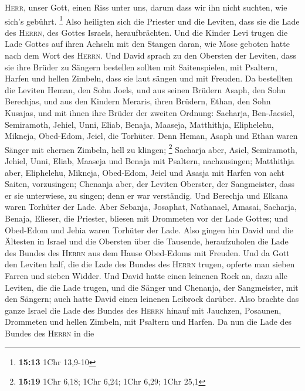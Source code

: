 \textsc{Herr}, unser Gott, einen Riss unter uns, darum dass wir ihn
nicht suchten, wie sich's gebührt. \footnote{\textbf{15:13} 1Chr 13,9-10}
 Also heiligten sich die Priester und die Leviten, dass
sie die Lade des \textsc{Herrn}, des Gottes Israels, heraufbrächten.
 Und die Kinder Levi trugen die Lade Gottes auf ihren
Achseln mit den Stangen daran, wie Mose geboten hatte nach dem Wort des
\textsc{Herrn}.  Und David sprach zu den Obersten der
Leviten, dass sie ihre Brüder zu Sängern bestellen sollten mit
Saitenspielen, mit Psaltern, Harfen und hellen Zimbeln, dass sie laut
sängen und mit Freuden.  Da bestellten die Leviten Heman,
den Sohn Joels, und aus seinen Brüdern Asaph, den Sohn Berechjas, und
aus den Kindern Meraris, ihren Brüdern, Ethan, den Sohn Kusajas,
 und mit ihnen ihre Brüder der zweiten Ordnung: Sacharja,
Ben-Jaesiel, Semiramoth, Jehiel, Unni, Eliab, Benaja, Maaseja,
Matthithja, Eliphelehu, Mikneja, Obed-Edom, Jeiel, die Torhüter.
 Denn Heman, Asaph und Ethan waren Sänger mit ehernen
Zimbeln, hell zu klingen; \footnote{\textbf{15:19} 1Chr 6,18; 1Chr 6,24;
  1Chr 6,29; 1Chr 25,1}  Sacharja aber, Asiel,
Semiramoth, Jehiel, Unni, Eliab, Maaseja und Benaja mit Psaltern,
nachzusingen;  Matthithja aber, Eliphelehu, Mikneja,
Obed-Edom, Jeiel und Asasja mit Harfen von acht Saiten, vorzusingen;
 Chenanja aber, der Leviten Oberster, der Sangmeister,
dass er sie unterwiese, zu singen; denn er war verständig.
 Und Berechja und Elkana waren Torhüter der Lade.
 Aber Sebanja, Josaphat, Nathanael, Amasai, Sacharja,
Benaja, Elieser, die Priester, bliesen mit Drommeten vor der Lade
Gottes; und Obed-Edom und Jehia waren Torhüter der Lade. 
Also gingen hin David und die Ältesten in Israel und die Obersten über
die Tausende, heraufzuholen die Lade des Bundes des \textsc{Herrn} aus
dem Hause Obed-Edoms mit Freuden.  Und da Gott den
Leviten half, die die Lade des Bundes des \textsc{Herrn} trugen, opferte
man sieben Farren und sieben Widder.  Und David hatte
einen leinenen Rock an, dazu alle Leviten, die die Lade trugen, und die
Sänger und Chenanja, der Sangmeister, mit den Sängern; auch hatte David
einen leinenen Leibrock darüber.  Also brachte das ganze
Israel die Lade des Bundes des \textsc{Herrn} hinauf mit Jauchzen,
Posaunen, Drommeten und hellen Zimbeln, mit Psaltern und Harfen.
 Da nun die Lade des Bundes des \textsc{Herrn} in die
